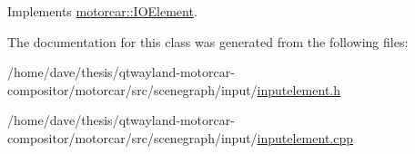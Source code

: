 Implements \hyperlink{classmotorcar_1_1IOElement_ab73b2687c5452ff694f20c40357ee219}{motorcar\-::\-I\-O\-Element}.



The documentation for this class was generated from the following files\-:\begin{DoxyCompactItemize}
\item 
/home/dave/thesis/qtwayland-\/motorcar-\/compositor/motorcar/src/scenegraph/input/\hyperlink{inputelement_8h}{inputelement.\-h}\item 
/home/dave/thesis/qtwayland-\/motorcar-\/compositor/motorcar/src/scenegraph/input/\hyperlink{inputelement_8cpp}{inputelement.\-cpp}\end{DoxyCompactItemize}
